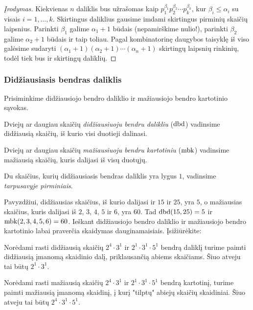 \begin{proof}[Įrodymas] Kiekvienas $n$ daliklis bus užrašomas kaip
  $p_1^{\beta_1}p_2^{\beta_2}\cdots p_k^{\beta_k}$, kur $\beta_i \leq
  \alpha_i$ su visais $i=1,\dots,k$. Skirtingus daliklius gausime imdami
  skirtingus pirminių skaičių laipsnius. Parinkti $\beta_1$ galime $\alpha_1
  + 1$ būdais (nepamirškime nulio!), parinkti $\beta_2$ galime $\alpha_2 + 1$
  būdais ir taip toliau. Pagal kombinatorinę daugybos taisyklę iš viso
  galėsime sudaryti $(\alpha_1 + 1)(\alpha_2 + 1)\cdots (\alpha_n + 1)$
  skirtingų laipsnių rinkinių, todėl tiek bus ir skirtingų daliklių.
\end{proof}

\subsubsection{Didžiausiasis bendras daliklis}

Prisiminkime didžiausiojo bendro daliklio ir mažiausiojo bendro kartotinio
sąvokas.

\begin{api}Dviejų ar daugiau skaičių \emph{didžiausiuoju bendru dalikliu} ($\operatorname{dbd}$)
  vadinsime didžiausią skaičių, iš kurio visi duotieji dalinasi.  
\end{api}

\begin{api} Dviejų ar daugiau skaičių \emph{mažiausiuoju bendru kartotiniu} ($\operatorname{mbk}$)
  vadinsime mažiausią skaičių, kuris dalijasi iš visų duotųjų.  
\end{api}

\begin{api}
  Du skaičius, kurių didžiausiasis bendras daliklis yra lygus $1$, vadinsime
  \emph{tarpusavyje pirminiais}.
\end{api}

Pavyzdžiui, didžiausias skaičius, iš kurio dalijasi ir $15$ ir $25$, yra $5$,
o mažiausias skaičius, kuris dalijasi iš $2$, $3$, $4$, $5$ ir $6$, yra
$60$. Tad $\operatorname{dbd}(15,25)=5$ ir $\operatorname{mbk}(2,3,4,5,6)=60$. Ieškant didžiausiojo
bendro daliklio ir mažiausiojo bendro kartotinio labai praverčia skaidymas
dauginamaisiais. Įsižiūrėkite:

Norėdami rasti didžiausią skaičių $2^4\cdot3^1$ ir $2^1\cdot3^1\cdot5^1$
bendrą daliklį turime paimti didžiausią įmanomą skaidinio dalį,
priklausančią abiems skaičiams. Šiuo atveju tai būtų $2^1\cdot3^1$.

Norėdami rasti mažiausią skaičių $2^4\cdot3^1$ ir $2^1\cdot3^1\cdot5^1$
bendrą kartotinį, turime paimti mažiausią įmanomą skaidinį, į kurį "tilptų"
abiejų skaičių skaidiniai. Šiuo atveju tai būtų $2^4 \cdot 3^1 \cdot 5^1$.

